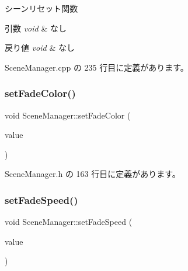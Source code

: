 シーンリセット関数 


\begin{DoxyParams}{引数}
{\em void} & なし \\
\hline
\end{DoxyParams}

\begin{DoxyRetVals}{戻り値}
{\em void} & なし \\
\hline
\end{DoxyRetVals}


 Scene\+Manager.\+cpp の 235 行目に定義があります。

\mbox{\label{class_scene_manager_a24e7fa08c34ecacdca37ee35c5c39141}} 
\subsubsection{\texorpdfstring{set\+Fade\+Color()}{setFadeColor()}}
{\footnotesize\ttfamily void Scene\+Manager\+::set\+Fade\+Color (\begin{DoxyParamCaption}\item[{\mbox{\hyperlink{_vector3_d_8h_a680c30c4a07d86fe763c7e01169cd6cc}{X\+Color4}}}]{value }\end{DoxyParamCaption})\hspace{0.3cm}{\ttfamily [inline]}}



 Scene\+Manager.\+h の 163 行目に定義があります。

\mbox{\label{class_scene_manager_af3b87ef963b80aa1942a2f804f61bdeb}} 
\subsubsection{\texorpdfstring{set\+Fade\+Speed()}{setFadeSpeed()}}
{\footnotesize\ttfamily void Scene\+Manager\+::set\+Fade\+Speed (\begin{DoxyParamCaption}\item[{float}]{value }\end{DoxyParamCaption})\hspace{0.3cm}{\ttfamily [inline]}}



